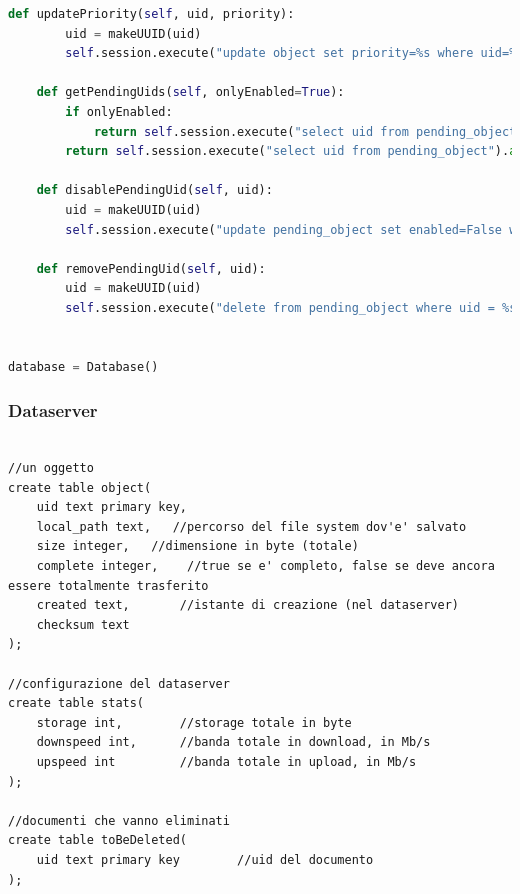 \documentclass[11pt,a4paper,english]{article}
\begin{document}
\begin{lstlisting}[language=Python, title=Codice]
    def updatePriority(self, uid, priority):
        uid = makeUUID(uid)
        self.session.execute("update object set priority=%s where uid=%s", (priority, uid))

    def getPendingUids(self, onlyEnabled=True):
        if onlyEnabled:
            return self.session.execute("select uid from pending_object where enabled=True allow filtering").all()
        return self.session.execute("select uid from pending_object").all()

    def disablePendingUid(self, uid):
        uid = makeUUID(uid)
        self.session.execute("update pending_object set enabled=False where uid = %s", (uid, ))

    def removePendingUid(self, uid):
        uid = makeUUID(uid)
        self.session.execute("delete from pending_object where uid = %s", (uid, ))


database = Database()
\end{lstlisting}



\subsubsection{Dataserver}

\begin{lstlisting}[title=Struttura]

//un oggetto
create table object(
    uid text primary key,
    local_path text,   //percorso del file system dov'e' salvato
    size integer,   //dimensione in byte (totale)
    complete integer,    //true se e' completo, false se deve ancora essere totalmente trasferito
    created text,       //istante di creazione (nel dataserver)
    checksum text
);

//configurazione del dataserver
create table stats(
    storage int,        //storage totale in byte
    downspeed int,      //banda totale in download, in Mb/s
    upspeed int         //banda totale in upload, in Mb/s 
);

//documenti che vanno eliminati
create table toBeDeleted(
    uid text primary key        //uid del documento
);


\end{lstlisting}
\end{document}
